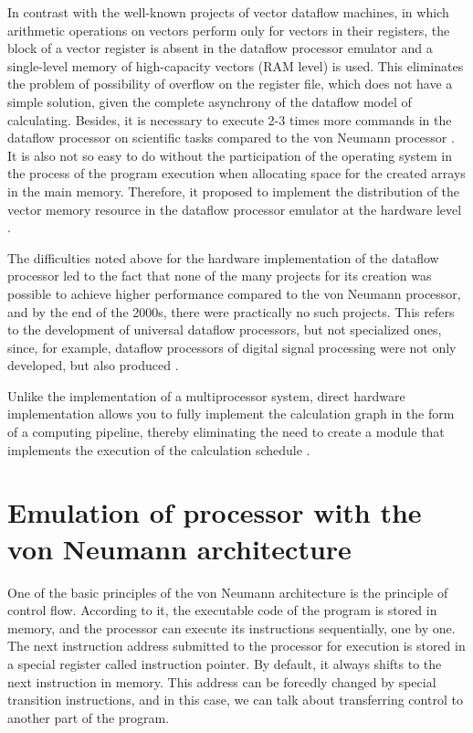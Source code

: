 \documentclass[
11pt,%
tightenlines,%
twoside,%
onecolumn,%
nofloats,%
nobibnotes,%
nofootinbib,%
superscriptaddress,%
noshowpacs,%
centertags]%
{revtex4}
\begin{document}
In contrast with the well-known projects of vector dataflow machines, in which arithmetic operations on vectors perform only for vectors in their registers, the block of a vector register is absent in the dataflow processor emulator and a single-level memory of high-capacity vectors (RAM level) is used.
This eliminates the problem of possibility of overflow on the register file, which does not have a simple solution, given the complete asynchrony of the dataflow model of calculating.
Besides, it is necessary to execute 2-3 times more commands in the dataflow processor on scientific tasks compared to the von Neumann processor \cite{multithreading}.
It is also not so easy to do without the participation of the operating system in the process of the program execution when allocating space for the created arrays in the main memory.
Therefore, it proposed to implement the distribution of the vector memory resource in the dataflow processor emulator at the hardware level \cite{vpp}.

The difficulties noted above for the hardware implementation of the dataflow processor led to the fact that none of the many projects for its creation was possible to achieve higher performance compared to the von Neumann processor, and by the end of the 2000s, there were practically no such projects.
This refers to the development of universal dataflow processors, but not specialized ones, since, for example, dataflow processors of digital signal processing were not only developed, but also produced \cite{terada}.

Unlike the implementation of a multiprocessor system, direct hardware implementation allows you to fully implement the calculation graph in the form of a computing pipeline, thereby eliminating the need to create a module that implements the execution of the calculation schedule \cite{popov}.

\section{Emulation of processor with the von Neumann architecture}

One of the basic principles of the von Neumann architecture is the principle of control flow.
According to it, the executable code of the program is stored in memory, and the processor can execute its instructions sequentially, one by one.
The next instruction address submitted to the processor for execution is stored in a special register called instruction pointer.
By default, it always shifts to the next instruction in memory.
This address can be forcedly changed by special transition instructions, and in this case, we can talk about transferring control to another part of the program.
\end{document}
